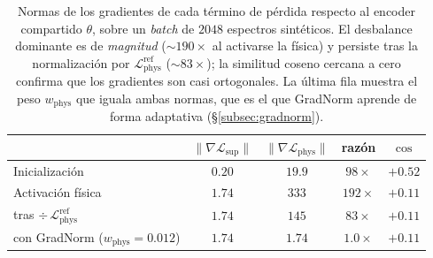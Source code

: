 \documentclass[sigconf,ACM]{acmart}
\begin{document}
\begin{table}[ht]
  \caption{Normas de los gradientes de cada término de pérdida respecto al
    encoder compartido $\theta$, sobre un \emph{batch} de $2048$ espectros
    sintéticos. El desbalance dominante es de \emph{magnitud} (${\sim}190\times$
    al activarse la física) y persiste tras la normalización por
    $\mathcal{L}_\mathrm{phys}^\mathrm{ref}$ (${\sim}83\times$); la similitud
    coseno cercana a cero confirma que los gradientes son casi ortogonales. La
    última fila muestra el peso $w_\mathrm{phys}$ que iguala ambas normas, que es
    el que GradNorm aprende de forma adaptativa (§\ref{subsec:gradnorm}).}
  \label{tab:grad}
  \small
  \setlength{\tabcolsep}{4pt}
  \begin{tabular}{@{}l c c c c@{}}
    \toprule
    & $\lVert\nabla\mathcal{L}_\mathrm{sup}\rVert$
    & $\lVert\nabla\mathcal{L}_\mathrm{phys}\rVert$
    & razón
    & $\cos$ \\
    \midrule
    Inicialización & $0.20$ & $19.9$ & $98\times$ & $+0.52$ \\
    Activación física & $1.74$ & $333$ & $192\times$ & $+0.11$ \\
    \;\;tras $\div\,\mathcal{L}_\mathrm{phys}^\mathrm{ref}$ & $1.74$ & $145$ & $83\times$ & $+0.11$ \\
    \;\;con GradNorm ($w_\mathrm{phys}{=}0.012$) & $1.74$ & $1.74$ & $\mathbf{1.0\times}$ & $+0.11$ \\
    \bottomrule
  \end{tabular}
\end{table}
\end{document}
